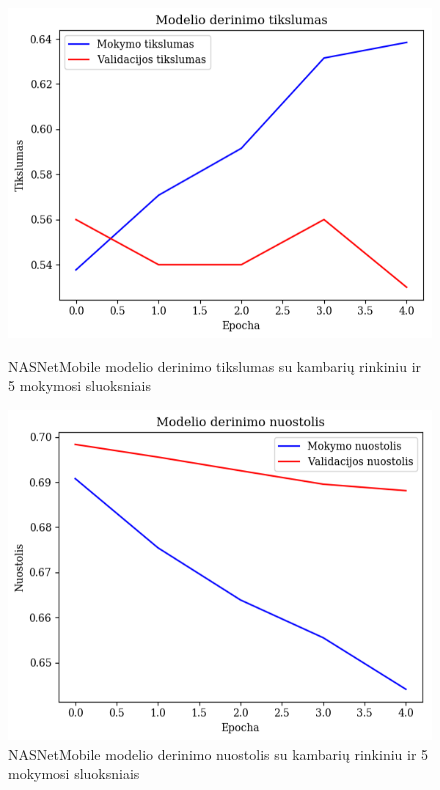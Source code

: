 \documentclass{VUMIFPSbakalaurinis}
\begin{document}
\begin{figure}[!htbp]
    \centering
    \begin{minipage}[b]{0.48\textwidth}
      \includegraphics[width=\textwidth]{img/GrapthsNEW/Small/room/5/Acc_R_S_5.png}
      \caption{NASNetMobile modelio derinimo tikslumas su kambarių rinkiniu ir 5 mokymosi sluoksniais}
    \end{minipage}
    \hspace{2mm}
    \begin{minipage}[b]{0.48\textwidth}
      \includegraphics[width=\textwidth]{img/GrapthsNEW/Small/room/5/Loss_R_S_5.png}
      \caption{NASNetMobile modelio derinimo nuostolis su kambarių rinkiniu ir 5 mokymosi sluoksniais}
    \end{minipage}
\end{figure}
\end{document}

